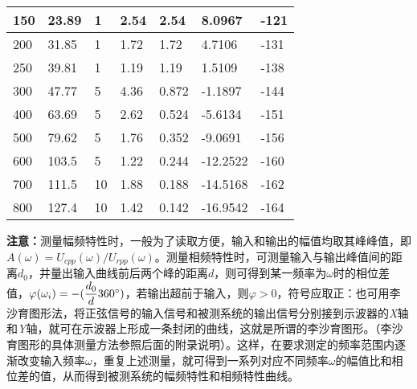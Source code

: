\documentclass[UTF8,a4paper,10pt]{ctexart}
\begin{document}
\begin{table}[h]
\begin{tabular}{|l|l|l|l|l|l|l|}
			150 & 23.89 & 1  & 2.54  & 2.54  & 8.0967    & -121   \\ \hline
			200 & 31.85 & 1  & 1.72  & 1.72  & 4.7106    & -131   \\ \hline
			250 & 39.81 & 1  & 1.19  & 1.19  & 1.5109    & -138   \\ \hline
			300 & 47.77 & 5  & 4.36  & 0.872 & -1.1897   & -144   \\ \hline
			400 & 63.69 & 5  & 2.62  & 0.524 & -5.6134   & -151   \\ \hline
			500 & 79.62 & 5  & 1.76  & 0.352 & -9.0691   & -156   \\ \hline
			600 & 103.5 & 5  & 1.22  & 0.244 & -12.2522  & -160   \\ \hline
			700 & 111.5 & 10 & 1.88  & 0.188 & -14.5168  & -162   \\ \hline
			800 & 127.4 & 10 & 1.42  & 0.142 & -16.9542  & -164   \\ \hline
		\end{tabular}
	\end{table}

	\textbf{注意：}测量幅频特性时，一般为了读取方便，输入和输出的幅值均取其峰峰值，即$A(\omega)=U_{cpp}(\omega)/U_{rpp}(\omega)$。测量相频特性时，可测量输入与输出峰值间的距离$d_{0}$，并量出输入曲线前后两个峰的距离$d$，则可得到某一频率为$\omega$时的相位差值，$\varphi(\omega_i)=-(\dfrac{d_0}{d}360 \degree )$，若输出超前于输入，则$\varphi >0$，符号应取正：也可用李沙育图形法，将正弦信号的输入信号和被测系统的输出信号分别接到示波器的\textit{X}轴和\textit{Y}轴，就可在示波器上形成一条封闭的曲线，这就是所谓的李沙育图形。（李沙育图形的具体测量方法参照后面的附录说明）。这样，在要求测定的频率范围内逐渐改变输入频率$\omega$，重复上述测量，就可得到一系列对应不同频率$\omega$的幅值比和相位差的值，从而得到被测系统的幅频特性和相频特性曲线。
	
\end{document}
